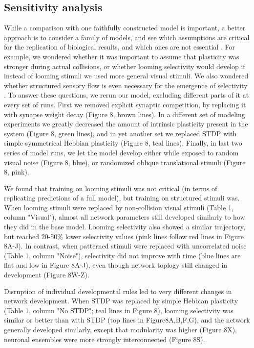 \documentclass{article}
\begin{document}
\subsection*{Sensitivity analysis}

While a comparison with one faithfully constructed model is important, a better approach is to consider a family of models, and see which assumptions are critical for the replication of biological results, and which ones are not essential \citep{linderman2017constrain,pauli2018repro}. For example, we wondered whether it was important to assume that  plasticity was stronger during actual collisions, or whether  looming selectivity would develop if instead of looming stimuli we used more general visual stimuli. We also wondered whether structured sensory flow is even necessary for the emergence of selectivity \citep{triplett2018emergence}. To answer these questions, we rerun our model, excluding different parts of it at every set of runs. First we removed explicit synaptic competition, by replacing it with synapse weight decay (Figure 8, brown lines). In a different set of modeling experiments we greatly decreased the amount of intrinsic plasticity present in the system (Figure 8, green lines), and in yet another set we replaced STDP with simple symmetrical Hebbian plasticity (Figure 8, teal lines). Finally, in last two series of model runs, we let the model develop either while exposed to random visual noise (Figure 8, blue), or randomized oblique translational stimuli (Figure 8, pink).

We found that training on looming stimuli was not critical (in terms of replicating predictions of a full model), but training on structured stimuli was. When looming stimuli were replaced by non-collision visual stimuli (Table 1, column "Visual"), almost all network parameters still developed similarly to how they did in the base model. Looming selectivity also showed a similar trajectory, but reached 20-50\% lower selectivity values (pink lines follow red lines in Figure 8A-J). In contrast, when patterned stimuli were replaced with uncorrelated noise (Table 1, column "Noise"), selectivity did not improve with time (blue lines are flat and low in Figure 8A-J), even though network toplogy still changed in development (Figure 8W-Z).

Disruption of individual developmental rules led to very different changes in network development. When STDP was replaced by simple Hebbian plasticity (Table 1, column "No STDP"; teal lines in Figure 8), looming selectivity was similar or better than with STDP (top lines in Figure8A,B,F,G), and the network generally developed similarly, except that modularity was higher (Figure 8X), neuronal ensembles were more strongly interconnected (Figure 8S). 
\end{document}
